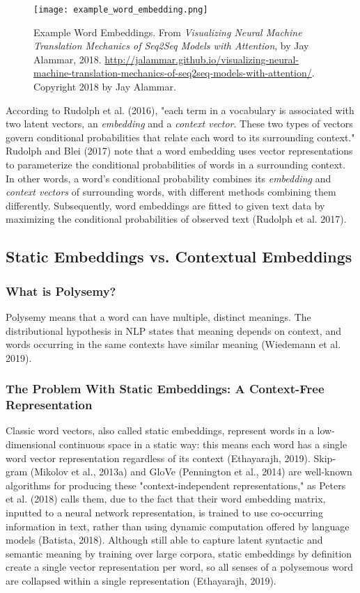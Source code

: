 \begin{figure}[h]
\centering
\texttt{[image: example\_word\_embedding.png]}
\caption{Example Word Embeddings. From \emph{Visualizing Neural Machine Translation Mechanics of Seq2Seq Models with Attention}, by Jay Alammar, 2018. \url{http://jalammar.github.io/visualizing-neural-machine-translation-mechanics-of-seq2seq-models-with-attention/}. Copyright 2018 by Jay Alammar.}
\end{figure}

According to Rudolph et al. (2016), "each term in a vocabulary is associated with two latent vectors, an \emph{embedding} and a \emph{context vector}. These two types of vectors govern conditional probabilities that relate each word to its surrounding context." 
Rudolph and Blei (2017) note that a word embedding uses vector representations to parameterize the conditional probabilities of words in a surrounding context. 
In other words, a word's conditional probability combines its \emph{embedding} and \emph{context vectors} of surrounding words, with different methods combining them differently. Subsequently, word embeddings are fitted to given text data by maximizing the conditional probabilities of observed text (Rudolph et al. 2017). 

\subsection{Static Embeddings vs. Contextual Embeddings}

\subsubsection{What is Polysemy?}

Polysemy means that a word can have multiple, distinct meanings. The distributional hypothesis in NLP states that meaning depends on context, and words occurring in the same contexts have similar meaning (Wiedemann et al. 2019). 

\subsubsection{The Problem With Static Embeddings: A Context-Free Representation}

Classic word vectors, also called static embeddings, represent words in a low-dimensional continuous space in a static way: this means each word has a single word vector representation regardless of its context (Ethayarajh, 2019). Skip-gram (Mikolov et al., 2013a) and GloVe (Pennington et al., 2014) are well-known algorithms for producing these "context-independent representations," as Peters et al. (2018) calls them, due to the fact that their word embedding matrix, inputted to a neural network representation, is trained to use co-occurring information in text, rather than using dynamic computation offered by language models (Batista, 2018). Although still able to capture latent syntactic and semantic meaning by training over large corpora, static embeddings by definition create a single vector representation per word, so all senses of a polysemous word are collapsed within a single representation (Ethayarajh, 2019). 

